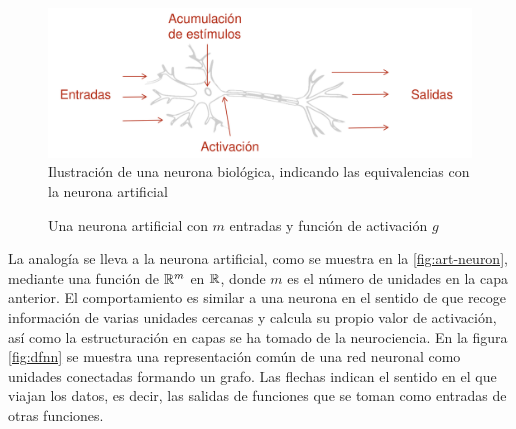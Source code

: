 \begin{figure}[hbtp]
  \centering
  \includegraphics[width=\textwidth]{images/neurona_biologica}
  \caption[Neurona biológica]{Ilustración de una neurona biológica, indicando las equivalencias con la neurona artificial}
  \label{fig:neuron}
\end{figure}

\begin{figure}[hbtp]
  \centering
  

  \caption[Neurona artificial]{Una neurona artificial con $m$ entradas y función de activación $g$}
  \label{fig:art-neuron}
\end{figure}

La analogía se lleva a la neurona artificial, como se muestra en la \autoref{fig:art-neuron}, mediante una función de \(\mathbb{R}^{m}\) en \(\mathbb{R}\),
donde \(m\) es el número de unidades en la capa anterior. El
comportamiento es similar a una neurona en el sentido de que recoge
información de varias unidades cercanas y calcula su propio valor de
activación, así como la estructuración en capas se ha tomado de la
neurociencia. En la figura \ref{fig:dfnn} se muestra una representación
común de una red neuronal como unidades conectadas formando un grafo.
Las flechas indican el sentido en el que viajan los datos, es decir, las
salidas de funciones que se toman como entradas de otras funciones.

